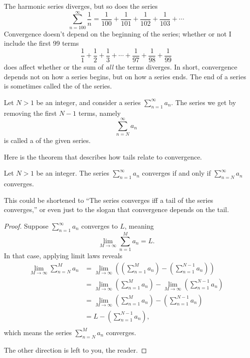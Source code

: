 \nobreak The harmonic series diverges, but so does the series
\[
\sum_{n=100}^\infty \frac{1}{n} = \frac{1}{100} + \frac{1}{101} + \frac{1}{102} + \frac{1}{103} + \cdots
\]
Convergence doesn't depend on the beginning of the series; whether or not I include the first 99 terms
\[
\frac{1}{1} + \frac{1}{2} + \frac{1}{3} + \cdots + \frac{1}{97} + \frac{1}{98} + \frac{1}{99}
\]
does affect whether or the sum of \textit{all} the terms diverges.  In
short, convergence depends not on how a series begins, but on how a
series ends.  The end of a series is sometimes called the
 of the series.

\begin{definition}
  Let $N > 1$ be an integer, and consider a series $\sum_{n=1}^\infty a_n$.  The series we get by removing the first $N-1$ terms, namely
\[
\sum_{n=N}^\infty a_n
\]
is called a  of the given series.
\end{definition}

Here is the theorem that describes how tails relate to convergence.
\begin{theorem}\label{thm:convergence-for-tails}
  Let $N > 1$ be an integer.  The series $\sum_{n=1}^\infty a_n$ converges if and only if $\sum_{n=N}^\infty a_n$ converges.
\end{theorem}
This could be shortened to ``The series converges iff a tail of the
series converges,'' or even just to the slogan that convergence
depends on the tail.
\begin{proof}
  Suppose $\sum_{n=1}^\infty a_n$ converges to $L$, meaning
\[
\lim_{M \to \infty} \sum_{n=1}^M a_n = L.
\]
In that case, applying limit laws reveals
\begin{align*}
\lim_{M \to \infty} \sum_{n=N}^M a_n
&= \lim_{M \to \infty} \left( \left( \sum_{n=1}^M a_n \right) - \left( \sum_{n=1}^{N-1} a_n \right) \right) \\
&= \lim_{M \to \infty} \left( \sum_{n=1}^M a_n \right) - \lim_{M \to \infty} \left( \sum_{n=1}^{N-1} a_n \right) \\
&= \lim_{M \to \infty} \left( \sum_{n=1}^M a_n \right) - \left( \sum_{n=1}^{N-1} a_n \right) \\
&= L - \left( \sum_{n=1}^{N-1} a_n \right), \\
\end{align*}
which means the series $\sum_{n=N}^M a_n$ converges.

The other direction is left to you, the reader.
\end{proof}

